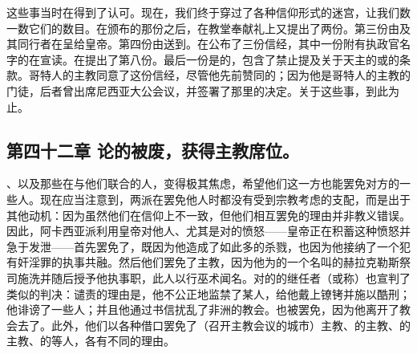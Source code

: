 这些事当时在得到了认可。现在，我们终于穿过了各种信仰形式的迷宫，让我们数一数它们的数目。在颁布的那份之后，在教堂奉献礼上又提出了两份。第三份由及其同行者在呈给皇帝。第四份由送到。在公布了三份信经，其中一份附有执政官名字的在宣读。在提出了第八份。最后一份是的，包含了禁止提及关于天主的或的条款。哥特人的主教同意了这份信经，尽管他先前赞同的；因为他是哥特人的主教的门徒，后者曾出席尼西亚大公会议，并签署了那里的决定。关于这些事，到此为止。\par


\subsection{第四十二章 论的被废，获得主教席位。}

、以及那些在与他们联合的人，变得极其焦虑，希望他们这一方也能罢免对方的一些人。现在应当注意到，两派在罢免他人时都没有受到宗教考虑的支配，而是出于其他动机：因为虽然他们在信仰上不一致，但他们相互罢免的理由并非教义错误。因此，阿卡西亚派利用皇帝对他人、尤其是对的愤怒——皇帝正在积蓄这种愤怒并急于发泄——首先罢免了，既因为他造成了如此多的杀戮，也因为他接纳了一个犯有奸淫罪的执事共融。然后他们罢免了主教，因为他为的一个名叫的赫拉克勒斯祭司施洗并随后授予他执事职，此人以行巫术闻名。对的的继任者（或称）也宣判了类似的判决：谴责的理由是，他不公正地监禁了某人，给他戴上镣铐并施以酷刑；他诽谤了一些人；并且他通过书信扰乱了非洲的教会。也被罢免，因为他离开了教会去了。此外，他们以各种借口罢免了（召开主教会议的城市）主教、的主教、的主教、的等人，各有不同的理由。\par


